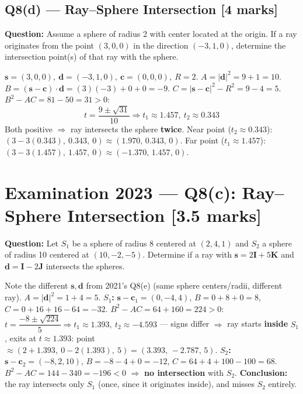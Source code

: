 \documentclass[12pt, a4paper]{article}
\newenvironment{solutionbox}{\begin{mdframed}[style=solutionframe]}{\end{mdframed}}
\newenvironment{answerbox}{\begin{mdframed}[style=answerframe]}{\end{mdframed}}
\begin{document}
\subsection*{Q8(d) --- Ray--Sphere Intersection [4 marks]}
\begin{solutionbox}
\textbf{Question:} Assume a sphere of radius 2 with center located at the origin. If a ray originates from the point $(3,0,0)$ in the direction $(-3,1,0)$, determine the intersection point(s) of that ray with the sphere.
\end{solutionbox}
\begin{answerbox}
$\mathbf{s}=(3,0,0),\ \mathbf{d}=(-3,1,0),\ \mathbf{c}=(0,0,0),\ R=2$. $A=|\mathbf{d}|^2=9+1=10$. $B=(\mathbf{s}-\mathbf{c})\cdot\mathbf{d}=(3)(-3)+0+0=-9$. $C=|\mathbf{s}-\mathbf{c}|^2-R^2=9-4=5$. $B^2-AC=81-50=31>0$:
$$t=\frac{9\pm\sqrt{31}}{10} \Rightarrow t_1\approx1.457,\ t_2\approx0.343$$
Both positive $\Rightarrow$ ray intersects the sphere \textbf{twice}. Near point ($t_2\approx0.343$): $(3-3(0.343),\ 0.343,\ 0)\approx(1.970,\,0.343,\,0)$. Far point ($t_1\approx1.457$): $(3-3(1.457),\ 1.457,\ 0)\approx(-1.370,\,1.457,\,0)$.
\end{answerbox}

\section{Examination 2023 --- Q8(c): Ray--Sphere Intersection [3.5 marks]}
\begin{solutionbox}
\textbf{Question:} Let $S_1$ be a sphere of radius 8 centered at $(2,4,1)$ and $S_2$ a sphere of radius 10 centered at $(10,-2,-5)$. Determine if a ray with $\mathbf{s}=2\mathbf{I}+5\mathbf{K}$ and $\mathbf{d}=\mathbf{I}-2\mathbf{J}$ intersects the spheres.
\end{solutionbox}
\begin{answerbox}
Note the different $\mathbf{s},\mathbf{d}$ from 2021's Q8(e) (same sphere centers/radii, different ray). $A=|\mathbf{d}|^2=1+4=5$.
\textbf{$S_1$:} $\mathbf{s}-\mathbf{c}_1=(0,-4,4)$, $B=0+8+0=8$, $C=0+16+16-64=-32$. $B^2-AC=64+160=224>0$: $t=\dfrac{-8\pm\sqrt{224}}{5}\Rightarrow t_1\approx1.393,\ t_2\approx-4.593$ --- signs differ $\Rightarrow$ ray starts \textbf{inside} $S_1$, exits at $t\approx1.393$: point $\approx(2{+}1.393,\ 0{-}2(1.393),\ 5)=(3.393,\,-2.787,\,5)$.
\textbf{$S_2$:} $\mathbf{s}-\mathbf{c}_2=(-8,2,10)$, $B=-8-4+0=-12$, $C=64+4+100-100=68$. $B^2-AC=144-340=-196<0$ $\Rightarrow$ \textbf{no intersection} with $S_2$.
\textbf{Conclusion:} the ray intersects only $S_1$ (once, since it originates inside), and misses $S_2$ entirely.
\end{answerbox}
\end{document}
